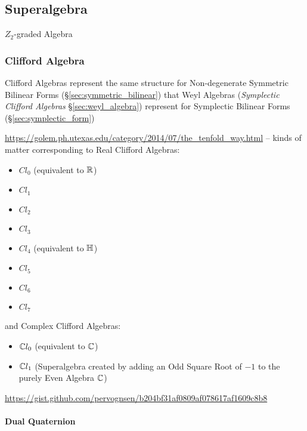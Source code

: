 {{\subsection{Superalgebra}\label{sec:superalgebra}

$Z_2$-graded Algebra



\subsubsection{Clifford Algebra}\label{sec:clifford_algebra}

Clifford Algebras represent the same structure for Non-degenerate Symmetric
Bilinear Forms (\S\ref{sec:symmetric_bilinear}) that Weyl Algebras
(\emph{Symplectic Clifford Algebras} \S\ref{sec:weyl_algebra}) represent for
Symplectic Bilinear Forms (\S\ref{sec:symplectic_form})

\url{https://golem.ph.utexas.edu/category/2014/07/the_tenfold_way.html} -- kinds
of matter corresponding to Real Clifford Algebras:
\begin{itemize}
\item $Cl_0$ (equivalent to $\mathbb{R}$)
\item $Cl_1$
\item $Cl_2$
\item $Cl_3$
\item $Cl_4$ (equivalent to $\mathbb{H}$)
\item $Cl_5$
\item $Cl_6$
\item $Cl_7$
\end{itemize}
and Complex Clifford Algebras:
\begin{itemize}
\item $\mathbb{C}{l}_0$ (equivalent to $\mathbb{C}$)
\item $\mathbb{C}{l}_1$ (Superalgebra created by adding an Odd Square Root of $-1$
  to the purely Even Algebra $\mathbb{C}$)
\end{itemize}

\url{https://gist.github.com/pervognsen/b204bf31af0809af078617af1609c8b8}



\paragraph{Dual Quaternion}\label{sec:dual_quaternion}\hfill


}}

